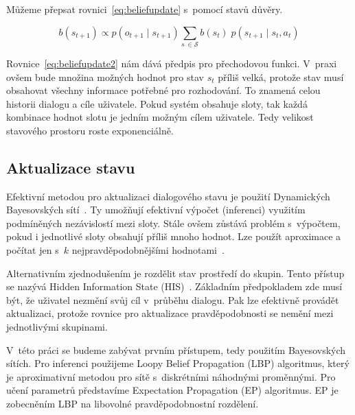 Můžeme přepsat rovnici~\eqref{eq:beliefupdate} s~pomocí stavů důvěry.

\begin{equation}
b(s_{t+1}) \propto
    p(o_{t+1} \mid s_{t+1})
    \sum_{s~\in \mathcal{S}}
        b(s_t)\;
        p(s_{t+1} \mid s_t, a_t)
\label{eq:beliefupdate2}
\end{equation}

Rovnice~\eqref{eq:beliefupdate2} nám dává předpis pro přechodovou funkci.
V~praxi ovšem bude množina možných hodnot pro stav $s_t$ příliš velká, protože stav musí obsahovat všechny informace potřebné pro rozhodování.
To znamená celou historii dialogu a cíle uživatele. 
Pokud systém obsahuje sloty, tak každá kombinace hodnot slotu je jedním možným cílem uživatele. 
Tedy velikost stavového prostoru roste exponenciálně.

\subsection{Aktualizace stavu}

Efektivní metodou pro aktualizaci dialogového stavu je použití Dynamických Bayesovských sítí~\cite{thomson2008bayesian}.
Ty umožňují efektivní výpočet (inferenci) využitím podmíněných nezávislostí mezi sloty.
Stále ovšem zůstává problém s~výpočtem, pokud i jednotlivé sloty obsahují příliš mnoho hodnot.
Lze použít aproximace a počítat jen s~$k$ nejpravděpodobnějšími hodnotami~\cite{thomson2010bayesian}.

Alternativním zjednodušením je rozdělit stav prostředí do skupin. 
Tento přístup se nazývá Hidden Information State (HIS)~\cite{young2010hidden}.
Základním předpokladem zde musí být, že uživatel nezmění svůj cíl v~průběhu dialogu.
Pak lze efektivně provádět aktualizaci, protože rovnice pro aktualizace pravděpodobnosti se nemění mezi jednotlivými skupinami.

V~této práci se budeme zabývat prvním přístupem, tedy použitím Bayesovských sítích.
Pro inferenci použijeme Loopy Belief Propagation (LBP) algoritmus, který je aproximativní metodou pro sítě s~diskrétními náhodnými proměnnými.
Pro učení parametrů představíme Expectation Propagation (EP) algoritmus.
EP je zobecněním LBP na libovolné pravděpodobnostní rozdělení.

